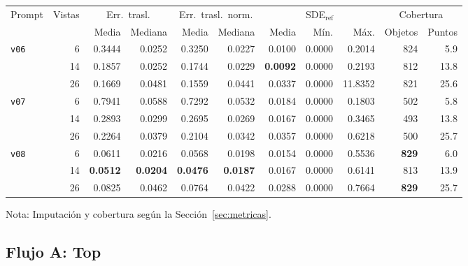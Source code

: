 \begin{table}[H]
\vspace{2ex}

\begin{tabular*}{\textwidth}{@{\extracolsep{\fill}}lrrrrrrrrrr@{}}
\toprule
\multirow{2}{*}{Prompt} & \multirow{2}{*}{Vistas} & \multicolumn{2}{c}{Err.\ trasl.} & \multicolumn{2}{c}{Err.\ trasl.\ norm.} & \multicolumn{3}{c}{SDE$_{\mathrm{ref}}$} & \multicolumn{2}{c}{Cobertura} \\
\cmidrule(lr){3-4} \cmidrule(lr){5-6} \cmidrule(lr){7-9} \cmidrule(lr){10-11}
 &  & Media & Mediana & Media & Mediana & Media & Mín. & Máx. & Objetos & Puntos \\
\midrule
\multirow{3}{*}{\texttt{v06}} & 6 & 0.3444 & 0.0252 & 0.3250 & 0.0227 & 0.0100 & 0.0000 & 0.2014 & 824 & 5.9 \\
 & 14 & 0.1857 & 0.0252 & 0.1744 & 0.0229 & \textbf{0.0092} & 0.0000 & 0.2193 & 812 & 13.8 \\
 & 26 & 0.1669 & 0.0481 & 0.1559 & 0.0441 & 0.0337 & 0.0000 & 11.8352 & 821 & 25.6 \\
\midrule
\multirow{3}{*}{\texttt{v07}} & 6 & 0.7941 & 0.0588 & 0.7292 & 0.0532 & 0.0184 & 0.0000 & 0.1803 & 502 & 5.8 \\
 & 14 & 0.2893 & 0.0299 & 0.2695 & 0.0269 & 0.0167 & 0.0000 & 0.3465 & 493 & 13.8 \\
 & 26 & 0.2264 & 0.0379 & 0.2104 & 0.0342 & 0.0357 & 0.0000 & 0.6218 & 500 & 25.7 \\
\midrule
\multirow{3}{*}{\texttt{v08}} & 6 & 0.0611 & 0.0216 & 0.0568 & 0.0198 & 0.0154 & 0.0000 & 0.5536 & \textbf{829} & 6.0 \\
 & 14 & \textbf{0.0512} & \textbf{0.0204} & \textbf{0.0476} & \textbf{0.0187} & 0.0167 & 0.0000 & 0.6141 & 813 & 13.9 \\
 & 26 & 0.0825 & 0.0462 & 0.0764 & 0.0422 & 0.0288 & 0.0000 & 0.7664 & \textbf{829} & 25.7 \\
\bottomrule
\end{tabular*}

\vspace{1.5ex}
\begin{minipage}{\textwidth}
Nota: Imputación y cobertura según la Sección~\ref{sec:metricas}.
\end{minipage}
\end{table}





\newpage
\clearpage
\subsection{Flujo A: Top}
\label{subsec:axis_top_224}

